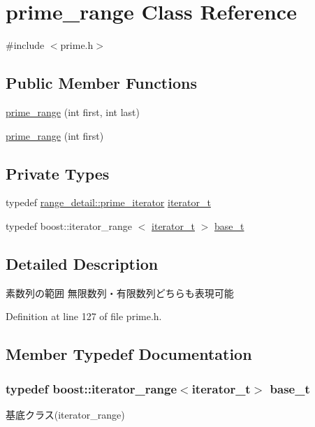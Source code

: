 \hypertarget{classyuh_1_1prime__range}{\section{prime\-\_\-range \-Class \-Reference}
\label{d5/d41/classyuh_1_1prime__range}
}


{\ttfamily \#include $<$prime.\-h$>$}

\subsection*{\-Public \-Member \-Functions}
\begin{DoxyCompactItemize}
\item 
\hyperlink{classyuh_1_1prime__range_aae62519f4eaff67463c1d2cb32e6e2fc}{prime\-\_\-range} (int first, int last)
\item 
\hyperlink{classyuh_1_1prime__range_ae1d6e243b47cf06c4c4b4cdc06ec2328}{prime\-\_\-range} (int first)
\end{DoxyCompactItemize}
\subsection*{\-Private \-Types}
\begin{DoxyCompactItemize}
\item 
typedef \*
\hyperlink{classyuh_1_1range__detail_1_1prime__iterator}{range\-\_\-detail\-::prime\-\_\-iterator} \hyperlink{classyuh_1_1prime__range_a4906d40c1f976001edeeb74a34231811}{iterator\-\_\-t}
\item 
typedef boost\-::iterator\-\_\-range\*
$<$ \hyperlink{classyuh_1_1prime__range_a4906d40c1f976001edeeb74a34231811}{iterator\-\_\-t} $>$ \hyperlink{classyuh_1_1prime__range_a9d51b0fc63206906184824c5b08403b2}{base\-\_\-t}
\end{DoxyCompactItemize}


\subsection{\-Detailed \-Description}
素数列の範囲 無限数列・有限数列どちらも表現可能 

\-Definition at line 127 of file prime.\-h.



\subsection{\-Member \-Typedef \-Documentation}
\hypertarget{classyuh_1_1prime__range_a9d51b0fc63206906184824c5b08403b2}{
\subsubsection[{base\-\_\-t}]{\setlength{\rightskip}{0pt plus 5cm}typedef boost\-::iterator\-\_\-range$<${\bf iterator\-\_\-t}$>$ {\bf base\-\_\-t}}}\label{d5/d41/classyuh_1_1prime__range_a9d51b0fc63206906184824c5b08403b2}
基底クラス(iterator\-\_\-range) 

